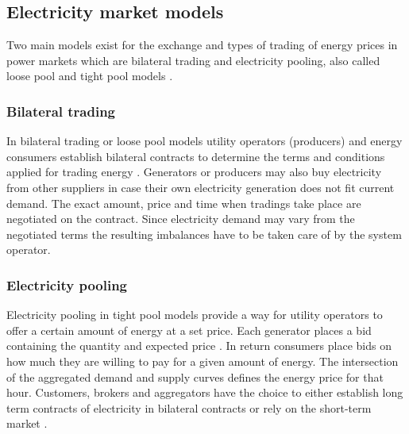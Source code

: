 \subsection{Electricity market models}

Two main models exist for the exchange and types of trading of energy prices in power markets which are bilateral trading and electricity pooling, also called loose pool and tight pool models \cite{onaiwu2009does,hogan1997reshaping,barroso2005classification,chao1999design}.

\subsubsection{Bilateral trading}

In bilateral trading or loose pool models utility operators (producers) and energy consumers establish bilateral contracts to determine the terms and conditions applied for trading energy \cite{onaiwu2009does,chao1999design}. Generators or producers may also buy electricity from other suppliers in case their own electricity generation does not fit current demand. The exact amount, price and time when tradings take place are negotiated on the contract. Since electricity demand may vary from the negotiated terms the resulting imbalances have to be taken care of by the system operator. 

\subsubsection{Electricity pooling}

Electricity pooling in tight pool models provide a way for utility operators to offer a certain amount of energy at a set price. Each generator places a bid containing the quantity and expected price \cite{barroso2005classification}. In return consumers place bids on how much they are willing to pay for a given amount of energy. The intersection of the aggregated demand and supply curves defines the energy price for that hour. 
Customers, brokers and aggregators have the choice to either establish long term contracts of electricity in bilateral contracts or rely on the short-term market \cite{hogan1997reshaping}.





